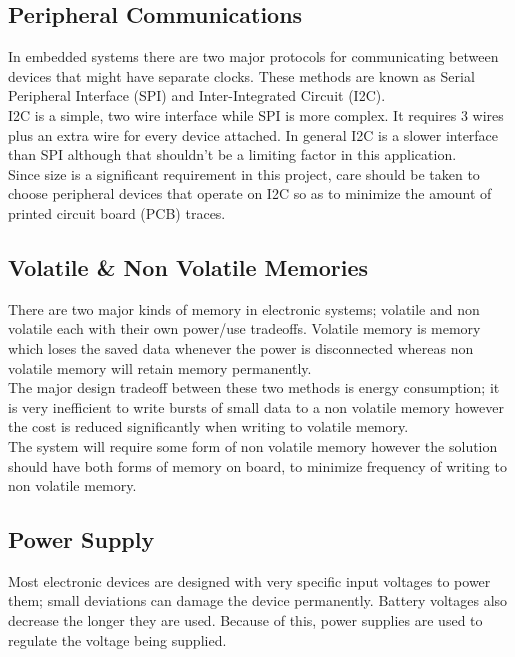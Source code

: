 \documentclass[12pt,openany,a4paper]{book}
\begin{document}
		\subsection{Peripheral Communications}
			In embedded systems there are two major protocols for communicating between devices that might have separate clocks. These methods are known as Serial Peripheral Interface (SPI) and Inter-Integrated Circuit (I2C). \\
			
			I2C is a simple, two wire interface while SPI is more complex. It requires 3 wires plus an extra wire for every device attached. In general I2C is a slower interface than SPI although that shouldn't be a limiting factor in this application. \\
			
			Since size is a significant requirement in this project, care should be taken to choose peripheral devices that operate on I2C so as to minimize the amount of printed circuit board (PCB) traces. 
			
		\subsection{Volatile \& Non Volatile Memories}
			There are two major kinds of memory in electronic systems; volatile and non volatile each with their own power/use tradeoffs. Volatile memory is memory which loses the saved data whenever the power is disconnected whereas non volatile memory will retain memory permanently. \\
			
			The major design tradeoff between these two methods is energy consumption; it is very inefficient to write bursts of small data to a non volatile memory \cite{Sandisk} however the cost is reduced significantly when writing to volatile memory. \\
			
			The system will require some form of non volatile memory however the solution should have both forms of memory on board, to minimize frequency of writing to non volatile memory.
			
		\subsection{Power Supply}
			Most electronic devices are designed with very specific input voltages to power them; small deviations can damage the device permanently. Battery voltages also decrease the longer they are used. Because of this, power supplies are used to regulate the voltage being supplied. \\
			
\end{document}

